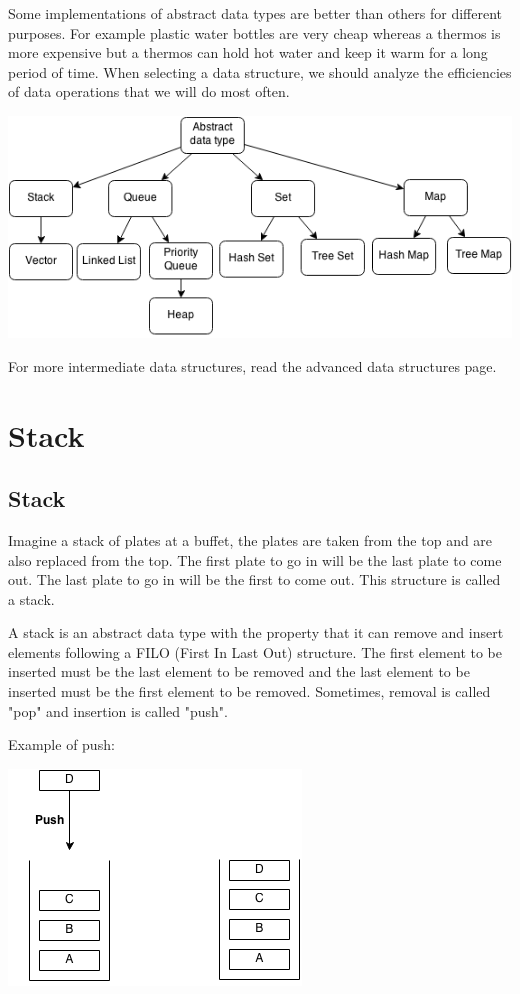 \documentclass[11pt,oneside]{book}
\makeatletter
\def\maxwidth#1{\ifdim\Gin@nat@width>#1 #1\else\Gin@nat@width\fi}
\makeatother
\begin{document}
Some implementations of abstract data types are better than others for different purposes. For example plastic water bottles are very cheap whereas a thermos is more expensive but a thermos can hold hot water and keep it warm for a long period of time. When selecting a data structure, we should analyze the efficiencies of data operations that we will do most often.

\vspace{5px}\includegraphics[width=\maxwidth{\textwidth}]{adt.png}

For more intermediate data structures, read the advanced data structures page.


    \chapter{ Stack }
        \section{ Stack }
        

Imagine a stack of plates at a buffet, the plates are taken from the top and are also replaced from the top. The first plate to go in will be the last plate to come out. The last plate to go in will be the first to come out. This structure is called a stack.

A stack is an abstract data type with the property that it can remove and insert elements following a FILO (First In Last Out) structure. The first element to be inserted must be the last element to be removed and the last element to be inserted must be the first element to be removed. Sometimes, removal is called "pop" and insertion is called "push".

Example of push:

\vspace{5px}\includegraphics[width=\maxwidth{\textwidth}]{stack.png}
\end{document}
